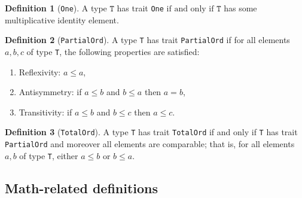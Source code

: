 \documentclass[11pt,a4paper]{article}
\theoremstyle{definition}
\newtheorem{definition}{Definition}[section]
\newcommand{\connor}[1]{{ {\color{teal}{(connor)~#1}}}}
\newcommand{\T}{\texttt{T}}
\newcommand{\iffText}{\text{if and only if}}
\begin{document}
\begin{definition}[\texttt{One}]
    A type $\T$ has trait \texttt{One} $\iffText$ $\T$ has some multiplicative identity element.
\end{definition}


\begin{definition}[\texttt{PartialOrd}]\label{def:partial}
A type \texttt{T} has trait \texttt{PartialOrd} if for all elements $a, b, c$ of type \texttt{T}, the following properties are satisfied:

    \begin{enumerate}
        \item Reflexivity: $a \leq a$,
        \item Antisymmetry: if $a \leq b$ and $b \leq a$ then $a=b$,
        \item Transitivity: if $a \leq b$ and $b \leq c$ then $a \leq c$.
    \end{enumerate}
\end{definition}

\begin{definition}[\texttt{TotalOrd}]
    A type \texttt{T} has trait \texttt{TotalOrd} if and only if \texttt{T} has trait \texttt{PartialOrd} and moreover all elements are comparable; that is, for all elements $a, b$ of type \texttt{T}, either $a \leq b$ or $b \leq a$.
    
    
\end{definition}

\subsection{Math-related definitions}
\connor{Since these should probably have similar definitions, they are here for now (i.e. not alphabetized) since this is the first version, and it will be easier to make changes if they're all grouped together. They will be brought into the alphabetical list later.}
\end{document}
